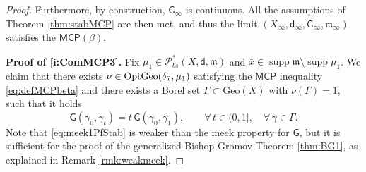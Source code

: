 \documentclass[11pt,a4paper]{article}
\theoremstyle{plain}
\theoremstyle{definition}
\theoremstyle{remark}
\numberwithin{equation}{section}
\DeclareMathOperator{\supp}{\mathrm{supp}}
\newcommand{\Geo}{\mathrm{Geo}}
\newcommand{\MCP}{\mathsf{MCP}}
\newcommand{\OptGeo}{{\rm OptGeo}}
\newcommand{\Prob}{\mathcal{P}}
\newcommand{\mm}{\mathfrak m}
\newcommand{\sfd}{\mathsf d}
\newcommand{\sfG}{\mathsf G}
\begin{document}
\begin{proof}
Furthermore, by construction, $\sfG_\infty$ is continuous. All the assumptions of Theorem \ref{thm:stabMCP} are then met, and thus the limit $(X_\infty,\sfd_\infty,\sfG_\infty,\mm_\infty)$ satisfies the $\MCP(\beta)$.


\textbf{Proof of \ref{i:ComMCP3}.} Fix $\mu_1 \in \Prob_{bs}^{*}(X,\sfd,\mm)$ and  $\bar{x}\in\supp\mm\setminus \supp \mu_{1}$. We claim that there exists $\nu \in \OptGeo(\delta_{\bar{x}},\mu_1)$ satisfying the $\MCP$ inequality \eqref{eq:defMCPbeta} and there exists a Borel set $\Gamma \subset \Geo(X)$ with $\nu(\Gamma)=1$, such that it holds
\begin{equation} \label{eq:meek1PfStab}
\sfG(\gamma_0,\gamma_t) = t\, \sfG(\gamma_0,\gamma_1), \qquad \forall\, t\in (0,1], \quad \forall\, \gamma \in \Gamma.
\end{equation}
Note that \eqref{eq:meek1PfStab} is weaker than the meek property for $\sfG$, but it is sufficient for the proof of the generalized Bishop-Gromov Theorem \ref{thm:BG1}, as explained in Remark \ref{rmk:weakmeek}.


\end{proof}
\end{document}
